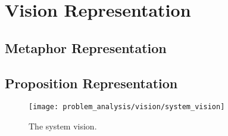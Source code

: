 \section{Vision Representation}

\subsection{Metaphor Representation}
\subsection{Proposition Representation}
\begin{figure}[!htbp]
    \centering
    \texttt{[image: problem\_analysis/vision/system\_vision]}
    \caption{The system vision.}
    \label{fig:system_vision}
\end{figure}
\FloatBarrier